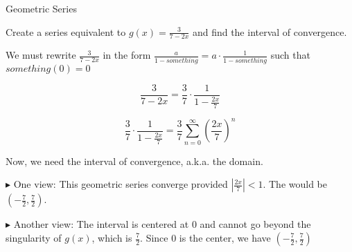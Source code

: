 \documentclass{ximera}
\begin{document}
\begin{example} Geometric Series



Create a series equivalent to $g(x)=\frac{3}{7 - 2x}$ and find the interval of convergence.



\begin{explanation}


We must rewrite $\frac{3}{7 - 2x}$ in the form $\frac{a}{1-something} = a \cdot \frac{1}{1-something}$ such that $something(0) = 0$




\[     \frac{3}{7 - 2x}  =   \frac{3}{7} \cdot \frac{1}{1 - \frac{2x}{7}}   \]



\[  \frac{3}{7} \cdot \frac{1}{1 - \frac{2x}{7}} =  \frac{3}{7} \sum\limits_{n=0}^{\infty} \left(\frac{2x}{7}\right)^n       \]





Now, we need the interval of convergence, a.k.a. the domain.  


$\blacktriangleright$ One view:  This geometric series converge provided   $\left| \frac{2x}{7} \right| < 1$.  The would be $\left(-\frac{7}{2}, \frac{7}{2} \right)$.



$\blacktriangleright$ Another view: The interval is centered at $0$ and cannot go beyond the singularity of $g(x)$, which is $\frac{7}{2}$.  Since $0$ is the center, we have $\left(-\frac{7}{2}, \frac{7}{2} \right)$


\end{explanation}





\end{example}
\end{document}

